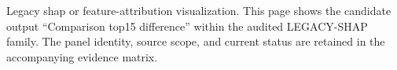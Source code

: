 Legacy shap or feature-attribution visualization. This page shows the candidate output ``Comparison top15 difference'' within the audited LEGACY-SHAP family. The panel identity, source scope, and current status are retained in the accompanying evidence matrix.
